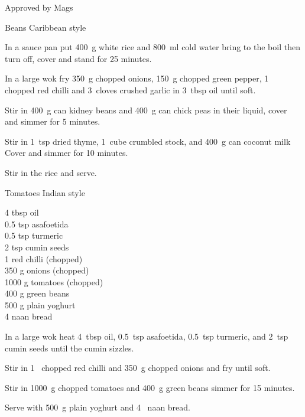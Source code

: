 \begin{menu}{Approved by Mags}
\begin{recipe}{2}{Beans Caribbean style}
    \begin{instructions}
    \item 
      In a
      sauce pan
      put
      400~g  white rice
      and
      800~ml  cold water
      bring to the boil then turn off, cover and stand for 25 minutes.
    \item 
        In a large wok fry
        350~g chopped onions,
        150~g chopped green pepper,
        1~ chopped red chilli
        and
        3~cloves crushed garlic
        in
        3~tbsp  oil
        until soft.
      \item 
        Stir in
        400~g  can kidney beans
        and
        400~g  can chick peas
        in their liquid,
        cover and simmer for 5 minutes.
      \item 
        Stir in
        1~tsp  dried thyme,
        1~cube crumbled stock,
        and
        400~g  can coconut milk
        Cover and simmer for 10 minutes.
      \item 
        Stir in the rice and serve.
      
    \end{instructions}
    \end{recipe}%
  
    \begin{recipe}{2}{Tomatoes Indian style}%
    
		\begin{ingredients}
		4 tbsp oil  \\
	0.5 tsp asafoetida  \\
	0.5 tsp turmeric  \\
	2 tsp cumin seeds  \\
	1  red chilli (chopped) \\
	350 g onions (chopped) \\
	1000 g tomatoes (chopped) \\
	400 g green beans  \\
	500 g plain yoghurt  \\
	4  naan bread  \\
	
		\end{ingredients}
	
	
    \begin{instructions}
    \item 
        In a large wok heat
        4~tbsp  oil,
        0.5~tsp  asafoetida,
        0.5~tsp  turmeric,
        and
        2~tsp  cumin seeds
        until
        the cumin sizzles.
      \item 
        Stir in
        1~ chopped red chilli
        and
        350~g chopped onions
        and
        fry until soft.
      \item 
        Stir in
        1000~g chopped tomatoes
        and
        400~g  green beans
        simmer for 15 minutes.
      \item 
        Serve with
        500~g  plain yoghurt
        and
        4~  naan bread.
      

\end{instructions}
\end{recipe}
\end{menu}
